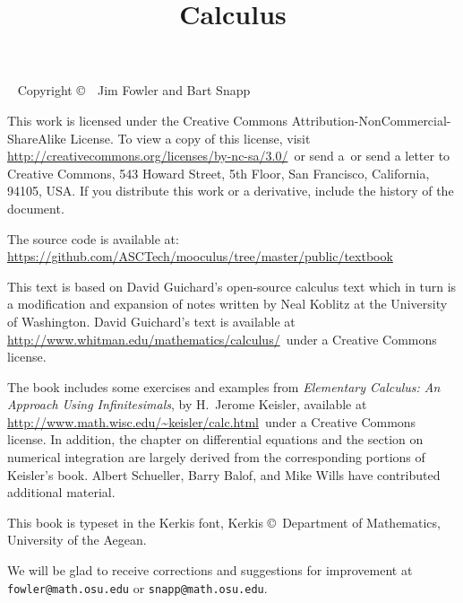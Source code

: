 \documentclass[justified,openany,nofonts]{tufte-book}
\title{Calculus}
\begin{document}
\maketitle



\begin{fullwidth}
~\vfill
\thispagestyle{empty}
\setlength{\parindent}{0pt}
\setlength{\parskip}{\baselineskip}
Copyright \copyright\ \the\year\ Jim Fowler and Bart Snapp

This work is licensed under the Creative Commons
Attribution-NonCommercial-ShareAlike License. To view a copy of this
license, visit
\url{http://creativecommons.org/licenses/by-nc-sa/3.0/}~or send a~or send a
letter to Creative Commons, 543 Howard Street, 5th Floor, San
Francisco, California, 94105, USA. If you distribute this work or a
derivative, include the history of the document. 

The source code is available
at: \url{https://github.com/ASCTech/mooculus/tree/master/public/textbook}

\noindent
This text is based on David Guichard's open-source calculus text which
in turn is a modification and expansion of notes written by Neal
Koblitz at the University of Washington. David Guichard's text is
available at \url{http://www.whitman.edu/mathematics/calculus/}~under a Creative Commons license.

\noindent The book includes some exercises and examples from {\it
  Elementary Calculus: An Approach Using Infinitesimals}, by H.~Jerome
Keisler, available at
\url{http://www.math.wisc.edu/~keisler/calc.html}~under a Creative
Commons license. In addition, the chapter on differential equations
and the section on numerical integration are largely derived from the
corresponding portions of Keisler's book.  Albert Schueller, Barry
Balof, and Mike Wills have contributed additional material.

\noindent This book is typeset in the Kerkis font, 
Kerkis \copyright~Department of Mathematics, University of the Aegean.


\noindent We will be glad to receive corrections and suggestions for
improvement at \texttt{fowler@math.osu.edu} or
\texttt{snapp@math.osu.edu}.

\end{fullwidth}


\tableofcontents


\end{document}
